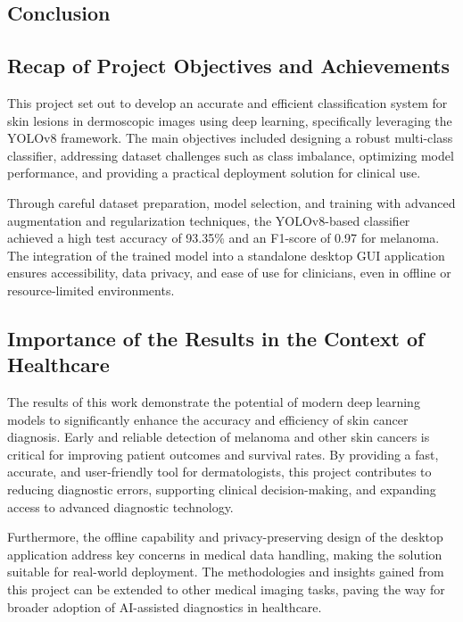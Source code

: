 \documentclass[a4paper,12pt]{report}
\begin{document}
\begin{spacing}{1.5}
\newpage

\chapter{Conclusion}

    \section*{Recap of Project Objectives and Achievements}
    
    This project set out to develop an accurate and efficient classification system for skin lesions in dermoscopic images using deep learning, specifically leveraging the YOLOv8 framework. The main objectives included designing a robust multi-class classifier, addressing dataset challenges such as class imbalance, optimizing model performance, and providing a practical deployment solution for clinical use.
    
    Through careful dataset preparation, model selection, and training with advanced augmentation and regularization techniques, the YOLOv8-based classifier achieved a high test accuracy of 93.35\% and an F1-score of 0.97 for melanoma. The integration of the trained model into a standalone desktop GUI application ensures accessibility, data privacy, and ease of use for clinicians, even in offline or resource-limited environments.
    
    \section*{Importance of the Results in the Context of Healthcare}
    
    The results of this work demonstrate the potential of modern deep learning models to significantly enhance the accuracy and efficiency of skin cancer diagnosis. Early and reliable detection of melanoma and other skin cancers is critical for improving patient outcomes and survival rates. By providing a fast, accurate, and user-friendly tool for dermatologists, this project contributes to reducing diagnostic errors, supporting clinical decision-making, and expanding access to advanced diagnostic technology.
    
    Furthermore, the offline capability and privacy-preserving design of the desktop application address key concerns in medical data handling, making the solution suitable for real-world deployment. The methodologies and insights gained from this project can be extended to other medical imaging tasks, paving the way for broader adoption of AI-assisted diagnostics in healthcare.
    

\end{spacing}
\end{document}
